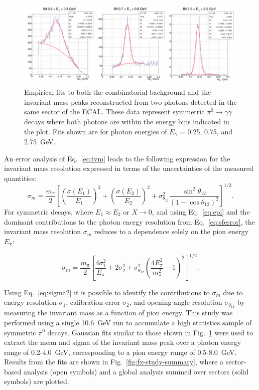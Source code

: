 \begin{figure}[h]
\centering
\includegraphics[width=1.0\columnwidth,keepaspectratio]{img/fx-pi0-fits.png}
\caption[]{Empirical fits to both the combinatorial background and the invariant mass peaks reconstructed from two
  photons detected in the same sector of the ECAL. These data represent symmetric
  $\pi^0 \rightarrow \gamma \gamma$ decays where both photons are within the energy bins indicated in the plot.
  Fits shown are for photon energies of $E_{\gamma}$ = 0.25, 0.75, and 2.75~GeV.}
\label{fig:fx-pi0-fits}
\end{figure}

An error analysis of Eq.~\ref{eq:ivm} leads to the following expression for the invariant mass resolution expressed
in terms of the uncertainties of the measured quantities:
\begin{equation}
  \sigma_m  = \frac{m_{\pi}}{2}\left[\left(\frac{\sigma(E_1)}{E_1}\right)^2 + \left(\frac{\sigma(E_2)}{E_2}\right)^2
    + \sigma^2_{\theta_{12}}\frac{\sin^2 \theta_{12}}{(1-\cos \theta_{12})^2}\right]^{1/2}.
\label{eq:sigmam1}
\end{equation}
For symmetric decays, where $E_1 \approx E_2$ or $X \rightarrow 0$, and using Eq.~\ref{eq:epi} and the dominant
contributions to the photon energy resolution from Eq.~\ref{eq:sferror}, the invariant mass resolution $\sigma_m$
reduces to a dependence solely on the pion energy $E_{\pi}$:

\begin{equation}
  \sigma_m = \frac{m_{\pi}}{2}\left[\frac{4 \sigma^2_1}{E_{\pi}} + 2 \sigma^2_2 +
    \sigma^2_{\theta_{12}}\left(\frac{4 E^2_{\pi}}{m^2_{\pi}}-1\right)^2\right]^{1/2}.
\label{eq:sigma2}
\end{equation}

Using Eq.~\ref{eq:sigma2} it is possible to identify the contributions to $\sigma_m$ due to energy resolution
$\sigma_1$, calibration error $\sigma_2$, and opening angle resolution $\sigma_{\theta_{12}}$ by measuring the
invariant mass as a function of pion energy. This study was performed using a single 10.6~GeV run to accumulate
a high statistics sample of symmetric $\pi^{0}$ decays. Gaussian fits similar to those shown in
Fig.~\ref{fig:fx-pi0-fits} were used to extract the mean and sigma of the invariant mass peak over a photon energy
range of 0.2-4.0~GeV, corresponding to a pion energy range of 0.5-8.0~GeV. Results from the fits are shown in
Fig.~\ref{fig:fx-study-summary}, where a sector-based analysis (open symbols) and a global analysis summed over
sectors (solid symbols) are plotted.  

